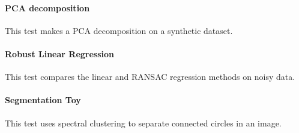 \documentclass[11pt]{article}
\begin{document}

\paragraph{PCA decomposition}

This test makes a PCA decomposition on a synthetic dataset.


\paragraph{Robust Linear Regression}

This test compares the linear and  RANSAC regression methods on noisy data.



\paragraph{Segmentation Toy}

This test uses spectral clustering to separate connected circles in an image.




\end{document}
